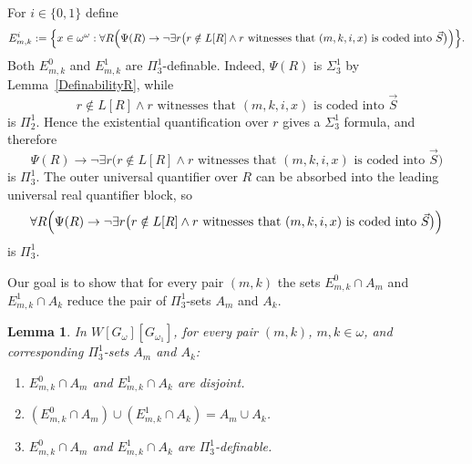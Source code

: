 \documentclass[a4paper,11pt]{article}
\newtheorem{lemma}[theorem]{Lemma}
\begin{document}
For $i\in\{0,1\}$ define
\[
E^i_{m,k}:=\Bigl\{x\in\omega^\omega:\forall R\Bigl(\Psi(R)\rightarrow
\neg\exists r\bigl(r\notin L[R]\land r\text{ witnesses that }(m,k,i,x)
\text{ is coded into }\vec S\bigr)\Bigr)\Bigr\}.
\]
Both $E^0_{m,k}$ and $E^1_{m,k}$ are $\Pi^1_3$-definable. Indeed, $\Psi(R)$ is $\Sigma^1_3$ by Lemma~\ref{DefinabilityR}, while
\[
r\notin L[R]\land r\text{ witnesses that }(m,k,i,x)\text{ is coded into }\vec S
\]
is $\Pi^1_2$. Hence the existential quantification over $r$ gives a $\Sigma^1_3$ formula, and therefore
\[
\Psi(R)\rightarrow
\neg\exists r\bigl(r\notin L[R]\land r\text{ witnesses that }(m,k,i,x)
\text{ is coded into }\vec S\bigr)
\]
is $\Pi^1_3$. The outer universal quantifier over $R$ can be absorbed into the leading universal real quantifier block, so
\[
\forall R\Bigl(\Psi(R)\rightarrow
\neg\exists r\bigl(r\notin L[R]\land r\text{ witnesses that }(m,k,i,x)
\text{ is coded into }\vec S\bigr)\Bigr)
\]
is $\Pi^1_3$.

Our goal is to show that for every pair $(m,k)$ the sets $E^0_{m,k}\cap A_m$ and $E^1_{m,k}\cap A_k$ reduce the pair of $\Pi^1_3$-sets $A_m$ and $A_k$.

\begin{lemma}
In $W[G_\omega][G_{\omega_1}]$, for every pair $(m,k)$, $m,k\in\omega$, and corresponding $\Pi^1_3$-sets $A_m$ and $A_k$:
\begin{enumerate}
\item[(a)] $E^0_{m,k}\cap A_m$ and $E^1_{m,k}\cap A_k$ are disjoint.
\item[(b)] $(E^0_{m,k}\cap A_m)\cup(E^1_{m,k}\cap A_k)=A_m\cup A_k$.
\item[(c)] $E^0_{m,k}\cap A_m$ and $E^1_{m,k}\cap A_k$ are $\Pi^1_3$-definable.
\end{enumerate}
\end{lemma}
\end{document}
